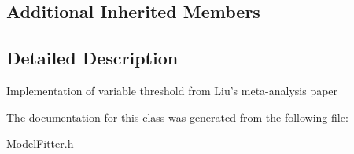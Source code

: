\subsection*{Additional Inherited Members}


\subsection{Detailed Description}
Implementation of variable threshold from Liu's meta-\/analysis paper 

The documentation for this class was generated from the following file\-:\begin{DoxyCompactItemize}
\item 
Model\-Fitter.\-h\end{DoxyCompactItemize}
